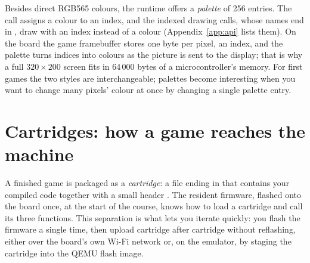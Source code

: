 Besides direct RGB565 colours, the runtime offers a \emph{palette} of 256
entries. The call  assigns a colour to an index, and
the indexed drawing calls, whose names end in , draw with an
index instead of a colour (Appendix~\ref{app:api} lists them). On the board the game framebuffer stores one byte per
pixel, an index, and the palette turns indices into colours as the picture is
sent to the display; that is why a full $320\times200$ screen fits in 64\,000
bytes of a microcontroller's memory. For first games the two styles are
interchangeable; palettes become interesting when you want to change many
pixels' colour at once by changing a single palette entry.

\section{Cartridges: how a game reaches the machine}

A finished \prg game is packaged as a \emph{cartridge}: a file ending in
 that contains your compiled \riscv code together with a small
header \citep{prg32cartfmt}. The resident firmware, flashed onto the board once,
at the start of the course, knows how to load a cartridge and call its three
functions. This separation is what lets you iterate quickly: you flash the
firmware a single time, then upload cartridge after cartridge without reflashing,
either over the board's own Wi-Fi network or, on the emulator, by staging the
cartridge into the QEMU flash image.

\begin{center}
\label{fig:pipeline}
\end{center}

